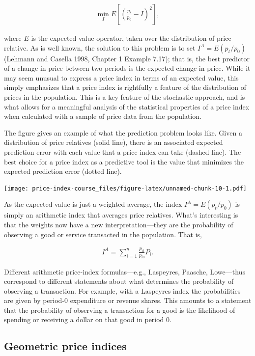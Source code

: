 \documentclass[]{article}
\begin{document}
\begin{align*}
\min_{I} E\left[\left(\frac{p_{t}}{p_{0}} - I \right)^{2}\right],
\end{align*}

where \(E\) is the expected value operator, taken over the distribution of price relative. As is well known, the solution to this problem is to set \(I^{A} = E(p_{t} / p_{0})\) (Lehmann and Casella 1998, Chapter 1 Example 7.17); that is, the best predictor of a change in price between two periods is the expected change in price. While it may seem unusual to express a price index in terms of an expected value, this simply emphasizes that a price index is rightfully a feature of the distribution of prices in the population. This is a key feature of the stochastic approach, and is what allows for a meaningful analysis of the statistical properties of a price index when calculated with a sample of price data from the population.

The figure gives an example of what the prediction problem looks like. Given a distribution of price relatives (solid line), there is an associated expected prediction error with each value that a price index can take (dashed line). The best choice for a price index as a predictive tool is the value that minimizes the expected prediction error (dotted line).

\texttt{[image: price-index-course\_files/figure-latex/unnamed-chunk-10-1.pdf]}

As the expected value is just a weighted average, the index \(I^{A} = E(p_{t} / p_{0})\) is simply an arithmetic index that averages price relatives. What's interesting is that the weights now have a new interpretation---they are the probability of observing a good or service transacted in the population. That is,

\begin{align*}
I^{A} = \sum_{i = 1}^{n} \frac{p_{it}}{p_{i0}} P_{i}.
\end{align*}

Different arithmetic price-index formulas---e.g., Laspeyres, Paasche, Lowe---thus correspond to different statements about what determines the probability of observing a transaction. For example, with a Laspeyres index the probabilities are given by period-0 expenditure or revenue shares. This amounts to a statement that the probability of observing a transaction for a good is the likelihood of spending or receiving a dollar on that good in period 0.

\hypertarget{geometric-price-indices-1}{%
\subsection{Geometric price indices}\label{geometric-price-indices-1}}
\end{document}

